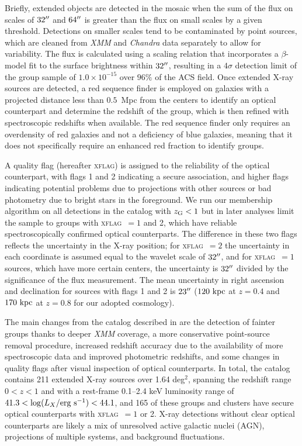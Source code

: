 Briefly, extended objects
are detected in the mosaic when the sum of the flux on scales of
$32\mbox{$^{\prime\prime}$}$ and $64\mbox{$^{\prime\prime}$}$ is greater than the flux on small scales
by a given threshold. Detections on smaller scales tend to be
contaminated by point sources, which are cleaned from {\sl XMM} and {\sl Chandra}
data separately to allow for variability. The flux is calculated using a
scaling relation that incorporates a $\beta$-model fit to the surface
brightness within $32\mbox{$^{\prime\prime}$}$, resulting in a $4\sigma$ detection
limit of the group sample of $1.0\times 10^{-15}$ \flux over $96\%$ of
the ACS field. Once extended X-ray sources are detected, a red
sequence finder is employed on galaxies with a projected distance less
than $0.5$~Mpc from the centers to identify an optical counterpart and
determine the redshift of the group, which is then refined with
spectroscopic redshifts when available. The red sequence finder only
requires an overdensity of red galaxies and not a deficiency of blue
galaxies, meaning that it does not specifically require an enhanced
red fraction to identify groups.

A quality flag (hereafter \textsc{xflag}) is assigned to the
reliability of the optical counterpart, with 
flags 1 and 2 indicating a secure association, and higher flags
indicating potential problems due to projections with other sources or
bad photometry due to bright stars in the foreground. We
run our membership algorithm on all detections in the catalog with
$\mbox{$z_{\rm G}$}<1$ but in later analyses limit the sample to groups with
\textsc{xflag}~$=1$ and 2, which have reliable spectroscopically confirmed optical
counterparts. The difference in these two flags 
reflects the uncertainty in the X-ray position; for \textsc{xflag}~$=2$ the
uncertainty in each coordinate is assumed equal to the wavelet scale
of $32\mbox{$^{\prime\prime}$}$, and for \textsc{xflag}~$=1$ sources, which have more certain centers,
the uncertainty is $32\mbox{$^{\prime\prime}$}$ divided by the significance of the flux
measurement. The mean uncertainty in right ascension and declination
for sources with flags 1 and 2 is $23\mbox{$^{\prime\prime}$}$ ($120~\rm{kpc}$ at
$z=0.4$ and $170~\rm{kpc}$ at $z=0.8$ for our adopted cosmology).

The main changes from the catalog described in \citet{Finoguenov2007}
are the detection of fainter groups thanks to deeper {\sl XMM}
coverage, a more conservative point-source removal procedure,
increased redshift accuracy due to the availability of more
spectroscopic data and improved photometric redshifts, and some
changes in quality flags after visual inspection of optical
counterparts. In total, the catalog contains 211
extended X-ray sources over 1.64 deg$^2$, spanning the
redshift range $0<z<1$ and with a rest-frame 0.1--2.4 keV luminosity
range of $41.3<\log(L_X/\mbox{erg s$^{-1}$})<44.1$, and 165 of these groups and
clusters have secure optical counterparts with \textsc{xflag}~$=1$ or
2. X-ray detections without clear optical counterparts are likely a
mix of unresolved active galactic nuclei (AGN), projections of
multiple systems, and background fluctuations.

